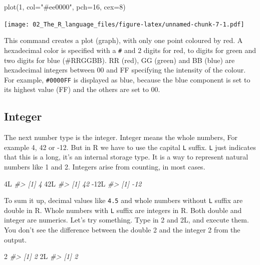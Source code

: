 \documentclass[
]{book}
\newenvironment{Shaded}{\begin{snugshade}}{\end{snugshade}}
\newcommand{\AttributeTok}[1]{\textcolor[rgb]{0.77,0.63,0.00}{#1}}
\newcommand{\CommentTok}[1]{\textcolor[rgb]{0.56,0.35,0.01}{\textit{#1}}}
\newcommand{\DecValTok}[1]{\textcolor[rgb]{0.00,0.00,0.81}{#1}}
\newcommand{\FunctionTok}[1]{\textcolor[rgb]{0.00,0.00,0.00}{#1}}
\newcommand{\NormalTok}[1]{#1}
\newcommand{\SpecialCharTok}[1]{\textcolor[rgb]{0.00,0.00,0.00}{#1}}
\newcommand{\StringTok}[1]{\textcolor[rgb]{0.31,0.60,0.02}{#1}}
\begin{document}
\begin{Shaded}
\begin{Highlighting}[]
\FunctionTok{plot}\NormalTok{(}\DecValTok{1}\NormalTok{, }\AttributeTok{col=}\StringTok{"\#ee0000"}\NormalTok{, }\AttributeTok{pch=}\DecValTok{16}\NormalTok{, }\AttributeTok{cex=}\DecValTok{8}\NormalTok{)}
\end{Highlighting}
\end{Shaded}

\texttt{[image: 02\_The\_R\_language\_files/figure-latex/unnamed-chunk-7-1.pdf]}

This command creates a plot (graph), with only one point coloured by red. A hexadecimal color is specified with a \texttt{\#} and 2 digits for red, to digits for green and two digits for blue (\#RRGGBB). RR (red), GG (green) and BB (blue) are hexadecimal integers between 00 and FF specifying the intensity of the colour. For example, \texttt{\#0000FF} is displayed as blue, because the blue component is set to its highest value (FF) and the others are set to 00.

\hypertarget{integer}{%
\subsection{Integer}\label{integer}}

The next number type is the integer. Integer means the whole numbers, For example 4, 42 or -12. But in R we have to use the capital \texttt{L} suffix. \texttt{L} just indicates that this is a long, it's an internal storage type. It is a way to represent natural numbers like 1 and 2. Integers arise from counting, in most cases.

\begin{Shaded}
\begin{Highlighting}[]
\NormalTok{4L}
\CommentTok{\#\textgreater{} [1] 4}
\NormalTok{42L}
\CommentTok{\#\textgreater{} [1] 42}
\SpecialCharTok{{-}}\NormalTok{12L}
\CommentTok{\#\textgreater{} [1] {-}12}
\end{Highlighting}
\end{Shaded}

To sum it up, decimal values like \texttt{4.5} and whole numbers without \texttt{L} suffix are double in R. Whole numbers with \texttt{L} suffix are integers in R. Both double and integer are numerics.
Let's try something. Type in 2 and 2L, and execute them. You don't see the difference between the double 2 and the integer 2 from the output.

\begin{Shaded}
\begin{Highlighting}[]
\DecValTok{2}
\CommentTok{\#\textgreater{} [1] 2}
\NormalTok{2L}
\CommentTok{\#\textgreater{} [1] 2}
\end{Highlighting}
\end{Shaded}
\end{document}
